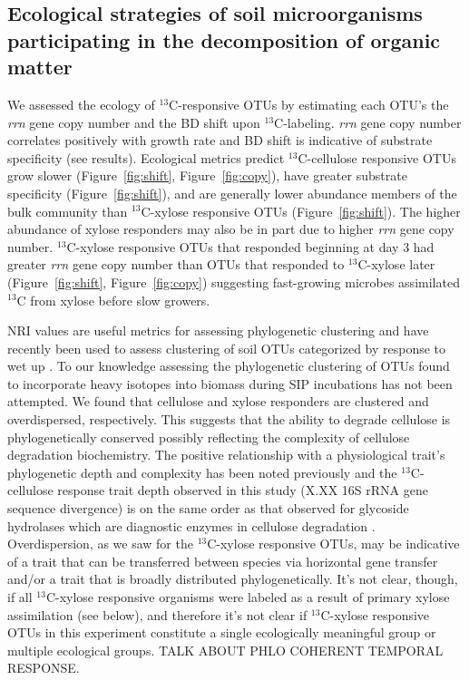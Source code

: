 \subsection{Ecological strategies of soil microorganisms participating in the
decomposition of organic matter}
We assessed the ecology of $^{13}$C-responsive OTUs by estimating each OTU's
the \textit{rrn} gene copy number and the BD shift upon $^{13}$C-labeling.
\textit{rrn} gene copy number correlates positively with growth rate
\citep{11125085} and BD shift is indicative of substrate specificity (see
results). Ecological metrics predict $^{13}$C-cellulose responsive OTUs grow
slower (Figure~\ref{fig:shift}, Figure~\ref{fig:copy}), have greater substrate
specificity (Figure~\ref{fig:shift}), and are generally lower abundance members
of the bulk community than $^{13}$C-xylose responsive OTUs
(Figure~\ref{fig:shift}). The higher abundance of xylose responders may also be
in part due to higher \textit{rrn} gene copy number. $^{13}$C-xylose responsive
OTUs that responded beginning at day 3 had greater \textit{rrn} gene copy
number than OTUs that responded to $^{13}$C-xylose later
(Figure~\ref{fig:shift}, Figure~\ref{fig:copy}) suggesting fast-growing
microbes assimilated $^{13}$C from xylose before slow growers.

NRI values are useful metrics for assessing phylogenetic clustering
\citep{Webb2000} and have recently been used to assess clustering of soil OTUs
categorized by response to wet up \citep{Evans2014a,Placella2012}. To our
knowledge assessing the phylogenetic clustering of OTUs found to incorporate
heavy isotopes into biomass during SIP incubations has not been attempted. We
found that cellulose and xylose responders are clustered and overdispersed,
respectively. This suggests that the ability to degrade cellulose is
phylogenetically conserved possibly reflecting the complexity of cellulose
degradation biochemistry. The positive relationship with a physiological
trait's phylogenetic depth and complexity has been noted previously
\citep{Martiny2013a} and the $^{13}$C-cellulose response trait depth observed
in this study (X.XX 16S rRNA gene sequence divergence) is on the same order as
that observed for glycoside hydrolases which are diagnostic enzymes in
cellulose degradation \citep{Berlemont2013}. Overdispersion, as we saw for the
$^{13}$C-xylose responsive OTUs, may be indicative of a trait that can be
transferred between species via horizontal gene transfer and/or a trait that is
broadly distributed phylogenetically. It's not clear, though, if all
$^{13}$C-xylose responsive organisms were labeled as a result of primary xylose
assimilation (see below), and therefore it's not clear if $^{13}$C-xylose
responsive OTUs in this experiment constitute a single ecologically meaningful
group or multiple ecological groups. TALK ABOUT PHLO COHERENT TEMPORAL
RESPONSE.

